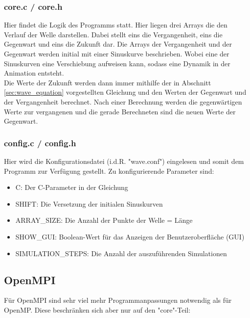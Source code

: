 \subsubsection{core.c / core.h}
Hier findet die Logik des Programms statt. Hier liegen drei Arrays die den Verlauf der Welle darstellen. Dabei stellt eins die Vergangenheit, eins die Gegenwart und eins die Zukunft dar. Die Arrays der Vergangenheit und der Gegenwart werden initial mit einer Sinuskurve beschrieben. Wobei eine der Sinuskurven eine Verschiebung aufweisen kann, sodass eine Dynamik in der Animation entsteht.\\
Die Werte der Zukunft werden dann immer mithilfe der in Abschnitt \ref{sec:wave_equation} vorgestellten Gleichung und den Werten der Gegenwart und der Vergangenheit berechnet. Nach einer Berechnung werden die gegenwärtigen Werte zur vergangenen und die gerade Berechneten sind die neuen Werte der Gegenwart.

\subsubsection{config.c / config.h}
Hier wird die Konfigurationsdatei (i.d.R. "wave.conf") eingelesen und somit dem Programm zur Verfügung gestellt. Zu konfigurierende Parameter sind:
\begin{itemize}
	\item C: Der C-Parameter in der Gleichung
	\item SHIFT: Die Versetzung der initialen Sinuskurven
	\item ARRAY\_SIZE: Die Anzahl der Punkte der Welle = Länge
	\item SHOW\_GUI: Boolean-Wert für das Anzeigen der Benutzeroberfläche (GUI)
	\item SIMULATION\_STEPS: Die Anzahl der auszuführenden Simulationen
\end{itemize}

\subsection{OpenMPI}
Für OpenMPI sind sehr viel mehr Programmanpassungen notwendig als für OpenMP. Diese beschränken sich aber nur auf den "core"-Teil:
